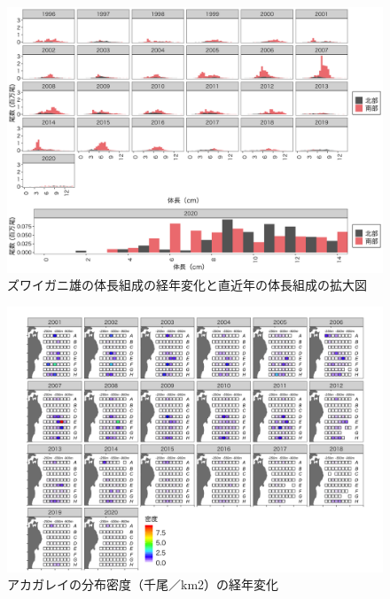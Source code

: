 \documentclass[11pt]{article} %
\begin{document}
\begin{linenumbers}
\begin{figure}[h]
  \centering
  \includegraphics[width = 14cm]{ズワイガニ雄length.png}
  \caption{ズワイガニ雄の体長組成の経年変化と直近年の体長組成の拡大図}
\end{figure}

\begin{figure}[h]
  \centering
  \includegraphics[width = 14cm]{アカガレイdens.png}
  \caption{アカガレイの分布密度（千尾／km2）の経年変化}
\end{figure}


\end{linenumbers}
\end{document}
